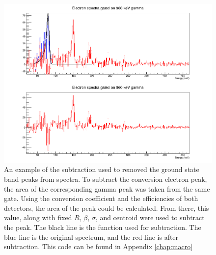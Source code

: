 \begin{figure}
    \centering
    \includegraphics[scale=0.4]{Analysis_Figs/Subtraction_SiLiAll_960.png}
    \caption{An example of the subtraction used to removed the ground state band peaks from spectra. To subtract the conversion electron peak, the area of the corresponding gamma peak was taken from the same gate. Using the conversion coefficient and the efficiencies of both detectors, the area of the peak could be calculated. From there, this value, along with fixed $R$, $\beta$, $\sigma$, and centroid were used to subtract the peak. The black line is the function used for subtraction. The blue line is the original spectrum, and the red line is after subtraction. This code can be found in Appendix \ref{chap:macro}}
    \label{fig:subtraction}
\end{figure}